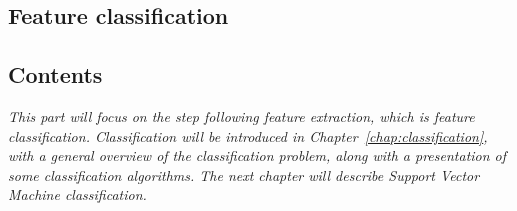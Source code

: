   \begin{titlepage}
    \vspace*{\fill}
      \part{Feature classification}
    \vspace*{\fill}
  \end{titlepage}

\startcontents[parts]

\chapter*{Contents}

\textit{This part will focus on the step following feature extraction, which is feature classification. Classification will be introduced in Chapter~\ref{chap:classification}, with a general overview of the classification problem, along with a presentation of some classification algorithms. The next chapter will describe Support Vector Machine classification.} 

\vspace{\baselineskip}


\pagebreak


\clearpage
\newpage


\stopcontents[parts]


